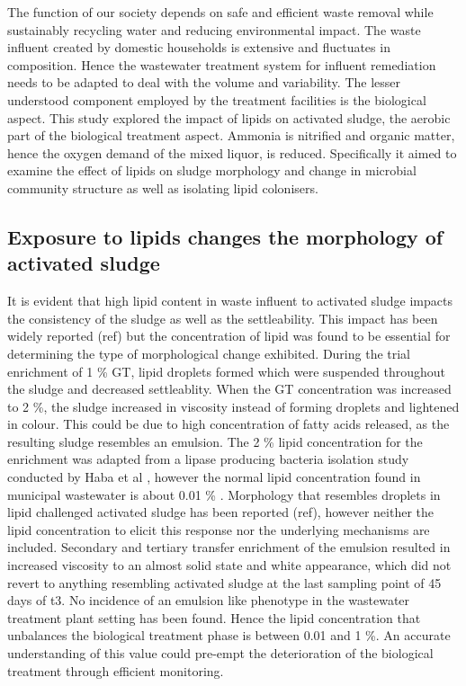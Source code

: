 \documentclass[11pt]{article}
\begin{document}
The function of our society depends on safe and efficient waste removal while sustainably recycling water and reducing environmental impact. The waste influent created by domestic households is extensive and fluctuates in composition. Hence the wastewater treatment system for influent remediation needs to be adapted to deal with the volume and variability. The lesser understood component employed by the treatment facilities is the biological aspect. This study explored the impact of lipids on activated sludge, the aerobic part of the biological treatment aspect. Ammonia is nitrified and organic matter, hence the oxygen demand of the mixed liquor, is reduced. Specifically it aimed to examine the effect of lipids on sludge morphology and change in microbial community structure as well as isolating lipid colonisers.

\subsection{Exposure to lipids changes the morphology of activated sludge}
It is evident that high lipid content in waste influent to activated sludge impacts the consistency of the sludge as well as the settleability. This impact has been widely reported (ref) but the concentration of lipid was found to be essential for determining the type of morphological change exhibited. During the trial enrichment of 1 \% GT, lipid droplets formed which were suspended throughout the sludge and decreased settleablity. When the GT concentration was increased to 2 \%, the sludge increased in viscosity instead of forming droplets and lightened in colour. This could be due to high concentration of fatty acids released, as the resulting sludge resembles an emulsion. The 2 \% lipid concentration for the enrichment was adapted from a lipase producing bacteria isolation study conducted by Haba et al \cite{haba2000isolation}, however the normal lipid concentration found in municipal wastewater is about 0.01 \% \cite{Forster_92}. Morphology that resembles droplets in lipid challenged activated sludge has been reported (ref), however neither the lipid concentration to elicit this response nor the underlying mechanisms are included. Secondary and tertiary transfer enrichment of the emulsion resulted in increased viscosity to an almost solid state and white appearance, which did not revert to anything resembling activated sludge at the last sampling point of 45 days of t3. No incidence of an emulsion like phenotype in the wastewater treatment plant setting has been found. Hence the lipid concentration that unbalances the biological treatment phase is between 0.01 and 1 \%. An accurate understanding of this value could pre-empt the deterioration of the biological treatment through efficient monitoring.
\end{document}
